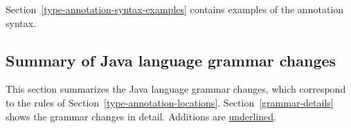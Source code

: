 \documentclass[10pt]{article}
\begin{document}
Section~\ref{type-annotation-syntax-examples} contains examples of the annotation syntax.


\subsection{Summary of Java language grammar changes\label{grammar-summary}}



This section
summarizes the Java language grammar changes, which correspond to
the rules of Section~\ref{type-annotation-locations}.
Section~\ref{grammar-details} shows the grammar changes in detail.
Additions are \underline{underlined}.



\newcommand{\term}[1]{\code{#1}}         %
\newcommand{\nt}[1]{\emph{#1}}           %
\newcommand{\opt}[1]{\emph{[}#1\emph{]}} %
\newcommand{\multi}[1]{\emph{\{}#1\emph{\}}} %
\newcommand{\alt}[1]{\emph{(}#1\emph{)}} %
\newcommand{\altor}[1]{\ensuremath{\mathit{|}}} %
\newcommand{\new}[1]{\underline{#1}}     %
\end{document}
